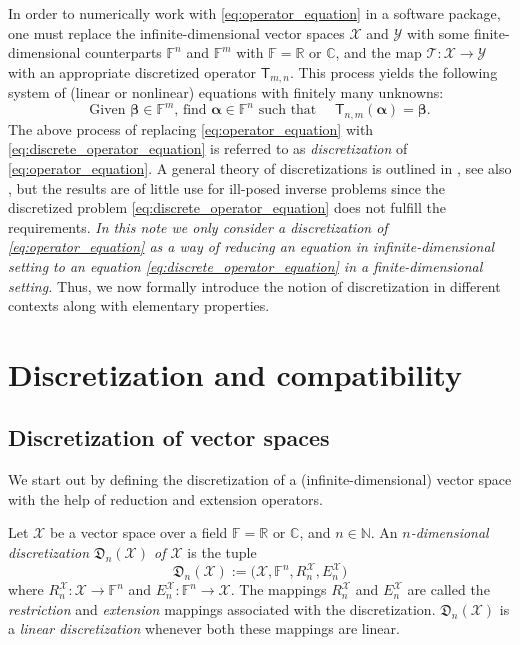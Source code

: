 \documentclass[a4paper]{paper}
\newcommand{\Discr}{\mathfrak{D}}
\newcommand{\VecSpace}[1]{\mathscr{#1}}
\newcommand{\Field}{\mathbb{F}}
\newcommand{\Real}{\mathbb{R}}
\newcommand{\Complex}{\mathbb{C}}
\newcommand{\Natural}{\mathbb{N}}
\newcommand{\Op}[1]{\mathcal{#1}}
\newcommand{\DiscOp}[1]{\mathsf{#1}}
\newcommand*{\EXT}[2]{\ensuremath{E_{#1}^{#2}}}
\newcommand*{\REST}[2]{\ensuremath{R_{#1}^{#2}}}
\newcommand*{\RnX}{\ensuremath{\REST{n}{\VecSpace{X}}}}
\newcommand*{\EnX}{\ensuremath{\EXT{n}{\VecSpace{X}}}}
\newcommand{\valpha}{\boldsymbol{\alpha}}
\newcommand{\vbeta}{\boldsymbol{\beta}}
\begin{document}
In order to numerically work with \eqref{eq:operator_equation} in a software package, one must replace the 
infinite-dimensional vector spaces $\VecSpace{X}$ and $\VecSpace{Y}$ with some finite-dimensional 
counterparts $\Field^{n}$ and $\Field^{m}$ with $\Field = \Real \text{ or } \Complex$, and the map 
$\Op{T} \colon \VecSpace{X} \to \VecSpace{Y}$ with an appropriate discretized operator 
$\DiscOp{T}_{m,n}$. This process yields the following system of (linear or nonlinear) equations
with finitely many unknowns:
%
\begin{equation}
 \label{eq:discrete_operator_equation}
 \text{Given $\vbeta \in \Field^{m}$, find $\valpha \in \Field^{n}$ such that }\quad \DiscOp{T}_{n,m} (\valpha)=\vbeta. 
\end{equation}
%
The above process of replacing \eqref{eq:operator_equation} with \eqref{eq:discrete_operator_equation} is referred to 
as \emph{discretization} of \eqref{eq:operator_equation}. A general theory of discretizations is outlined in 
\cite[Chapter~34]{ZeIIB85}, see also \cite{Pe93}, but the results are of little use for ill-posed inverse 
problems since the discretized problem \eqref{eq:discrete_operator_equation} does not fulfill the requirements.
\emph{In this note we only consider a discretization of \eqref{eq:operator_equation} 
as a way of reducing an equation in infinite-dimensional setting to an equation 
\eqref{eq:discrete_operator_equation} in a finite-dimensional setting.}
Thus, we now formally introduce the notion of discretization in different contexts along with elementary properties.


\section{Discretization and compatibility}
\label{sec:discretization_compatibility}

\subsection{Discretization of vector spaces}
\label{subsec:space_discretization}

We start out by defining the discretization of a (infinite-dimensional) vector space with the help of 
reduction and extension operators.

\begin{definition}
 \label{def:space_discretization}
 Let $\VecSpace{X}$ be a vector space over a field $\Field = \Real \text{ or } \Complex$, and $n \in \Natural$.
 An \emph{$n$-dimensional discretization $\Discr_{n}(\VecSpace{X})$ of $\VecSpace{X}$} is the tuple
 \begin{equation*}
  \Discr_{n}(\VecSpace{X}) := \bigl( \VecSpace{X}, \Field^{n}, \RnX, \EnX \bigr) 
 \end{equation*}
 where $\RnX \colon \VecSpace{X} \to \Field^{n}$ and $\EnX \colon \Field^{n} \to \VecSpace{X}$. The mappings $\RnX$ and $\EnX$ are called 
 the \emph{restriction} and \emph{extension} mappings associated with the discretization. $\Discr_n(\VecSpace{X})$ is a \emph{linear 
 discretization} whenever both these mappings are linear.
\end{definition}
\end{document}
